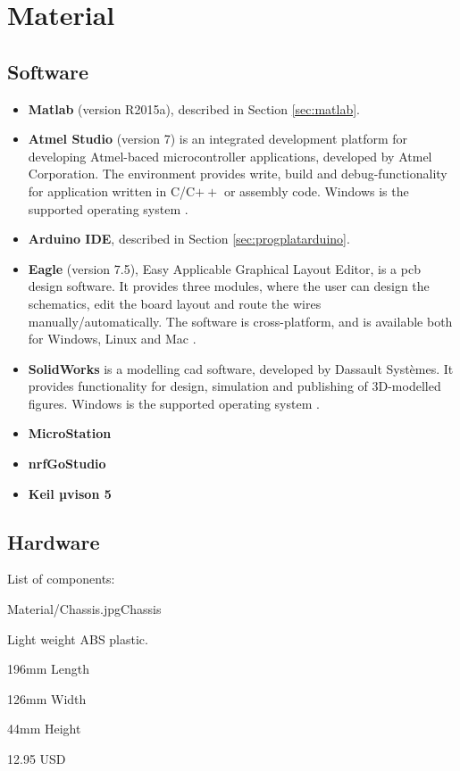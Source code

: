\chapter{Material}

\section{Software}
\label{sec:software}
\begin{itemize}
    \item \textbf{Matlab} (version R2015a), described in Section \ref{sec:matlab}.
    \item \textbf{Atmel Studio} (version 7) is an integrated development platform for developing Atmel-baced microcontroller applications, developed by Atmel Corporation. The environment provides write, build and debug-functionality for application written in C/C$++$ or assembly code. Windows is the supported operating system \cite{atmel}. 
    \item \textbf{Arduino IDE}, described in Section \ref{sec:progplatarduino}.
    \item \textbf{Eagle} (version 7.5), Easy Applicable Graphical Layout Editor, is a \acrfull{pcb} design software. It provides three modules, where the user can design the schematics, edit the board layout and route the wires manually/automatically. The software is cross-platform, and is available both for Windows, Linux and Mac \cite{eagle}.
    \item \textbf{SolidWorks} is a modelling \acrfull{cad} software, developed by Dassault Systèmes. It provides functionality for design, simulation and publishing of 3D-modelled figures. Windows is the supported operating system \cite{solidworks}.
    \item \textbf{MicroStation}
    \item \textbf{nrfGoStudio}
    \item \textbf{Keil  µvison 5}
\end{itemize}


\section{Hardware}
\label{sec:hardware}
List of components:

\begin{material}{Material/Chassis.jpg}{Chassis}
\item Light weight ABS plastic.
\item 196mm Length 
\item 126mm Width 
\item 44mm Height
\item 12.95 USD
\end{material}

